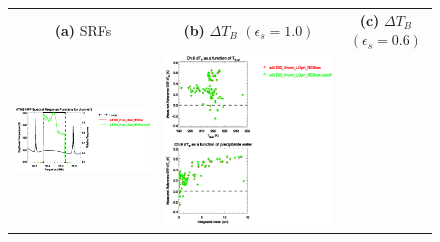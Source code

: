 \begin{figure}[H]
  \centering
  \begin{tabular}{c c c}
    \textsf{\textbf{(a)} SRFs} &
    \textsf{\textbf{(b)} $\Delta T_B$ $(\epsilon_s = 1.0)$} &
    \textsf{\textbf{(c)} $\Delta T_B$ $(\epsilon_s = 0.6)$} \\
    \includegraphics[bb=80 400 280 558,clip,scale=0.85]{graphics/srf/Rset/atms_npp.ch9.osrf.eps} &
    \includegraphics[bb=85 400 260 558,clip,scale=0.85]{graphics/dtb/Rset/e1.0_r0.0/atms_npp.ch9.dTb.eps} & 

\end{tabular}
\end{figure}
